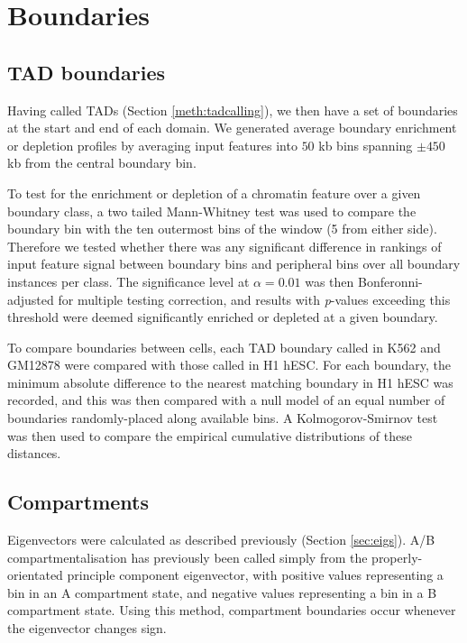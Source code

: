 \documentclass[a4paper,11pt,oneside]{book}
\begin{document}
\section{Boundaries}\label{boundaries}

\subsection{TAD boundaries}\label{meth:tadbounds}

Having called TADs (Section \ref{meth:tadcalling}), we then have a set of boundaries at the start and end of each domain. We generated average boundary enrichment or depletion profiles by averaging input features into $50$ kb bins spanning $\pm450$ kb from the central boundary bin.

To test for the enrichment or depletion of a chromatin feature over a
given boundary class, a two tailed Mann-Whitney test was used to compare the
boundary bin with the ten outermost bins of the window (5 from either
side). Therefore we tested whether there was any significant difference in rankings of input feature signal between boundary bins and peripheral bins over all boundary instances per class. The significance level at $\alpha = 0.01$ was then
Bonferonni-adjusted for multiple testing correction, and results with
\emph{p}-values exceeding this threshold were deemed significantly
enriched or depleted at a given boundary.

To compare boundaries between cells, each TAD boundary called in K562 and GM12878 were compared with those called in H1 hESC. For each boundary, the minimum absolute difference to the nearest matching boundary in H1 hESC was recorded, and this was then compared with a null model of an equal number of boundaries randomly-placed along available bins. A Kolmogorov-Smirnov test was then used to compare the empirical cumulative distributions of these distances.

\subsection{Compartments}\label{sec:compartments}

Eigenvectors were calculated as described previously (Section \ref{sec:eigs}). A/B compartmentalisation has previously been called simply from the properly-orientated principle component eigenvector, with positive values representing a bin in an A compartment state, and negative values representing a bin in a B compartment state.\cite{Lieberman2009} Using this method, compartment boundaries occur whenever the eigenvector changes sign.
\end{document}
